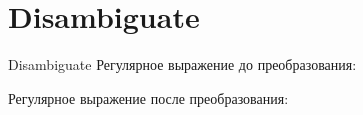 \section{Disambiguate}
\begin{frame}{Disambiguate}
	Регулярное выражение до преобразования:

	Регулярное выражение после преобразования:

\end{frame}
